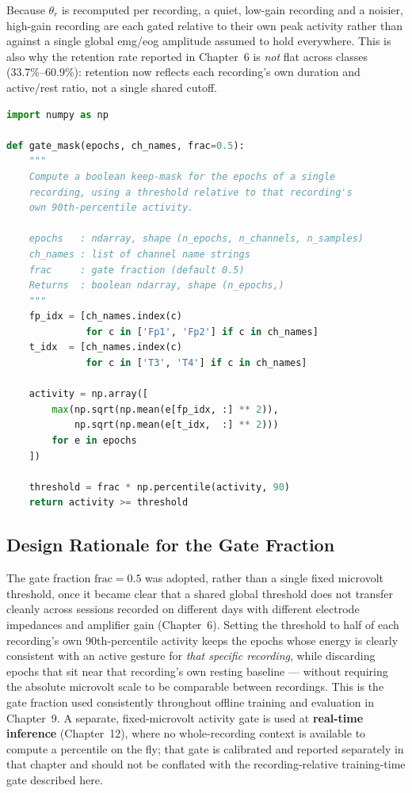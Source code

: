 Because $\theta_r$ is recomputed per recording, a quiet,
low-gain recording and a noisier, high-gain recording are each
gated relative to their own peak activity rather than against a
single global \acrshort{emg}/\acrshort{eog} amplitude assumed to
hold everywhere. This is also why the retention rate reported in
Chapter~6 is \emph{not} flat across classes (33.7\%--60.9\%):
retention now reflects each recording's own duration and
active/rest ratio, not a single shared cutoff.

\begin{lstlisting}[language=Python,
    caption={Recording-relative activity gate implementation
    (\code{activity\_gate.py}).},
    label={lst:gate}]
import numpy as np

def gate_mask(epochs, ch_names, frac=0.5):
    """
    Compute a boolean keep-mask for the epochs of a single
    recording, using a threshold relative to that recording's
    own 90th-percentile activity.

    epochs   : ndarray, shape (n_epochs, n_channels, n_samples)
    ch_names : list of channel name strings
    frac     : gate fraction (default 0.5)
    Returns  : boolean ndarray, shape (n_epochs,)
    """
    fp_idx = [ch_names.index(c)
              for c in ['Fp1', 'Fp2'] if c in ch_names]
    t_idx  = [ch_names.index(c)
              for c in ['T3', 'T4'] if c in ch_names]

    activity = np.array([
        max(np.sqrt(np.mean(e[fp_idx, :] ** 2)),
            np.sqrt(np.mean(e[t_idx,  :] ** 2)))
        for e in epochs
    ])

    threshold = frac * np.percentile(activity, 90)
    return activity >= threshold
\end{lstlisting}

\subsection{Design Rationale for the Gate Fraction}

The gate fraction $\text{frac} = 0.5$ was adopted, rather than a
single fixed microvolt threshold, once it became clear that a
shared global threshold does not transfer cleanly across
sessions recorded on different days with different electrode
impedances and amplifier gain (Chapter~6). Setting the threshold
to half of each recording's own 90th-percentile activity keeps
the epochs whose energy is clearly consistent with an active
gesture for \emph{that specific recording}, while discarding
epochs that sit near that recording's own resting baseline ---
without requiring the absolute microvolt scale to be comparable
between recordings. This is the gate fraction used consistently
throughout offline training and evaluation in Chapter~9. A
separate, fixed-microvolt activity gate is used at
\textbf{real-time inference} (Chapter~12), where no
whole-recording context is available to compute a percentile
on the fly; that gate is calibrated and reported separately in
that chapter and should not be conflated with the
recording-relative training-time gate described here.


